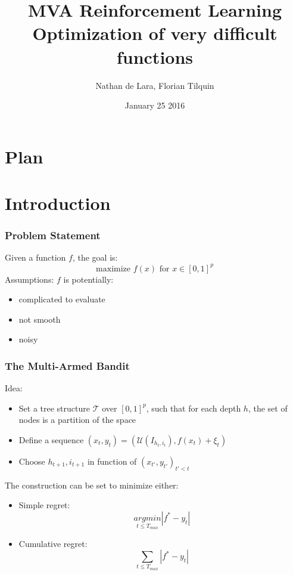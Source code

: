 \documentclass[xcolor={usenames,dvipsnames}]{beamer}
\begin{document}

\title{MVA Reinforcement Learning\\
Optimization of very difficult functions}
\author{Nathan de Lara, Florian Tilquin}
\date{January 25 2016}


\begin{frame}
\titlepage
\end{frame}

\usebackgroundtemplate{ }

\section*{Plan}

\section{Introduction}
\begin{frame}
\frametitle{Problem Statement}
Given a function $f$, the goal is:
\begin{equation}
\mbox{maximize } f(x) \mbox{ for } x\in [0,1]^p
\end{equation}
Assumptions: $f$ is potentially:
\begin{itemize}
\item complicated to evaluate
\item not smooth
\item noisy
\end{itemize}
\end{frame}

\begin{frame}
\frametitle{The Multi-Armed Bandit}
Idea:
\begin{itemize}
\item Set a tree structure $\mathcal{T}$ over $[0,1]^p$, such that for each depth $h$, the set of nodes is a partition of the space
\item Define a sequence $(x_t,y_t)=(\mathcal{U}(I_{h_t,i_t}),f(x_t)+\xi_t)$
\item Choose $h_{t+1},i_{t+1}$ in function of $(x_{t'},y_{t'})_{t'<t}$
\end{itemize}
The construction can be set to minimize either:
\begin{itemize}
\item Simple regret: \begin{equation}
\underset{t\le T_{max}}{argmin}|f^*-y_t|
\end{equation}
\item Cumulative regret: \begin{equation}\underset{t\le T_{max}}{\sum}|f^*-y_t| \end{equation}
\end{itemize}
\end{frame}
\end{document}
